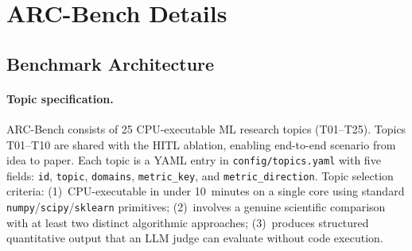 \documentclass{llmxive}
\begin{document}
\section{ARC-Bench Details}
\label{app:arcbench}

\subsection{Benchmark Architecture}
\label{app:arcbench-arch}

\paragraph{Topic specification.}
ARC-Bench consists of 25 CPU-executable ML research topics (T01--T25).
Topics T01--T10 are shared with the HITL ablation, enabling end-to-end scenario from idea to paper.
Each topic is a YAML entry in \texttt{config/topics.yaml} with five fields: \texttt{id}, \texttt{topic}, \texttt{domains}, \texttt{metric\_key}, and \texttt{metric\_direction}.
Topic selection criteria: (1)~CPU-executable in under 10~minutes on a single core using standard \texttt{numpy}/\texttt{scipy}/\texttt{sklearn} primitives; (2)~involves a genuine scientific comparison with at least two distinct algorithmic approaches; (3)~produces structured quantitative output that an LLM judge can evaluate without code execution.
\end{document}
